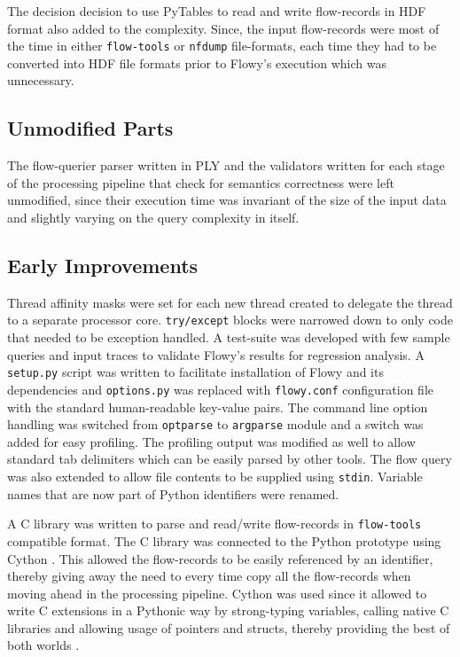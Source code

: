 The decision decision to use PyTables to read and write flow-records in \ac{HDF} format also added to the complexity. Since, the input flow-records were most of the time in either \texttt{flow-tools} or \texttt{nfdump} file-formats, each time they had to be converted into \ac{HDF} file formats prior to Flowy's execution which was unnecessary.

\subsection{Unmodified Parts}\label{subsec:unmodified-parts}
The flow-querier parser written in \ac{PLY} and the validators written for each stage of the processing pipeline that check for semantics correctness were left unmodified, since their execution time was invariant of the size of the input data and slightly varying on the query complexity in itself.

\subsection{Early Improvements}\label{subsec:early-improvements}
Thread affinity masks were set for each new thread created to delegate the thread to a separate processor core. \texttt{try/except} blocks were narrowed down to only code that needed to be exception handled. A test-suite was developed with few sample queries and input traces to validate Flowy's results for regression analysis. A \texttt{setup.py} script was written to facilitate installation of Flowy and its dependencies and \texttt{options.py} was replaced with \texttt{flowy.conf} configuration file with the standard human-readable key-value pairs. The command line option handling was switched from \texttt{optparse} to \texttt{argparse} module and a switch was added for easy profiling. The profiling output was modified as well to allow standard tab delimiters which can be easily parsed by other tools. The flow query was also  extended to allow file contents to be supplied using \texttt{stdin}. Variable names that are now part of Python identifiers were renamed. 

A C library was written to parse and read/write flow-records in \texttt{flow-tools} compatible format. The C library was connected to the Python prototype using Cython \cite{dseljebotn:2009}\cite{wilbers:2009}. This allowed the flow-records to be easily referenced by an identifier, thereby giving away the need to every time copy all the flow-records when moving ahead in the processing pipeline. Cython was used since it allowed to write C extensions in a Pythonic way by strong-typing variables, calling native C libraries and allowing usage of pointers and structs, thereby providing the best of both worlds \cite{sbehnel:2011}. 

